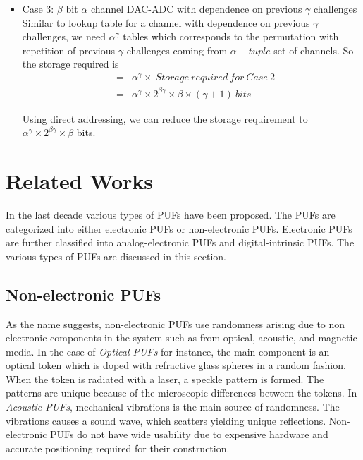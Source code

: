 \begin{itemize}
\begin{itemize}
\begin{itemize}
\item Case 3: $\beta$ bit $\alpha$ channel DAC-ADC with dependence on previous $\gamma$ challenges\\
Similar to lookup table for a channel with dependence on previous $\gamma$ challenges, we need $\alpha ^ \gamma$ tables which corresponds to the permutation with repetition of previous $\gamma$ challenges coming from  $\alpha-tuple$ set of channels. So the storage required is
\begin{eqnarray}
&=& \alpha ^ \gamma \times\ Storage\ required\ for \ Case\ 2 \nonumber \\
&=&  \alpha ^ \gamma \times 2^{\beta\gamma} \times \beta\times(\gamma + 1)\ bits
\end{eqnarray}

Using direct addressing, we can reduce the storage requirement to $\alpha ^ \gamma \times 2^{\beta\gamma} \times \beta$ bits.
\end{itemize}

\end{itemize} 
\end{itemize}

\section{Related Works}
In the last decade various types of PUFs have been proposed. The PUFs are categorized into either
electronic PUFs or non-electronic PUFs. Electronic PUFs are further classified into analog-electronic
PUFs and digital-intrinsic PUFs. The various types of PUFs are discussed in this section.

\subsection{Non-electronic PUFs}
As the name suggests, non-electronic PUFs use randomness arising due to non electronic components in the system
such as from optical, acoustic, and magnetic media. In the case of \textit{Optical PUFs} for instance, the main 
component is an optical token which is doped with refractive glass spheres in a random fashion. When the token is 
radiated with a laser, a speckle pattern is formed. The patterns are  unique because  of the microscopic differences 
between the tokens. In \textit{Acoustic PUFs}, mechanical vibrations is the main source of
randomness. The vibrations causes a sound wave, which scatters yielding unique reflections. 
Non-electronic PUFs do not have wide usability due to expensive hardware and accurate positioning 
required for their construction.

